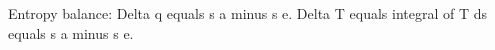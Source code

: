 Entropy balance:  
Delta q equals s a minus s e.  
Delta T equals integral of T ds equals s a minus s e.